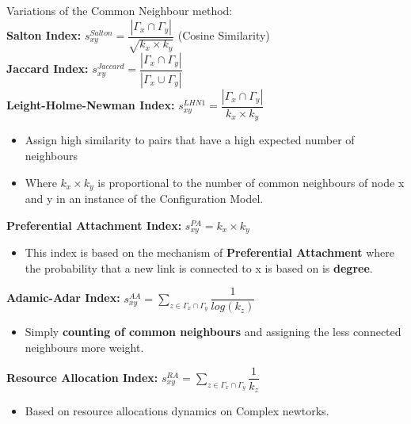 \documentclass{beamer}
\begin{document}
\begin{frame}
\bigskip
Variations of the Common Neighbour method: \\
\bigskip
\textbf{Salton Index:} $s^{Salton}_{xy} = \dfrac{|\Gamma_{x} \cap \Gamma_{y}|}{\sqrt{k_{x} \times k_{y}}}$ (Cosine Similarity)\\
\bigskip
\textbf{Jaccard Index:}  $s^{Jaccard}_{xy} = \dfrac{|\Gamma_{x} \cap \Gamma_{y}|}{|\Gamma_{x} \cup \Gamma_{y}|}$\\
\bigskip
\textbf{Leight-Holme-Newman Index:}  $s^{LHN1}_{xy} = \dfrac{|\Gamma_{x} \cap \Gamma_{y}|}{k_{x} \times k_{y}}$ \\
\begin{itemize}
    \item Assign high similarity to pairs that have a high expected number of neighbours 
    \item Where $k_{x} \times k_{y}$ is proportional to the number of common neighbours of node x and y in an instance of the Configuration Model.
\end{itemize}
\end{frame}

\begin{frame}
\textbf{Preferential Attachment Index:} $s^{PA}_{xy} = k_{x} \times k_{y}$ \\
\begin{itemize}
    \item This index is based on the mechanism of \textbf{Preferential Attachment}  where the probability that a new link is connected to x is based on is \textbf{degree}. 
\end{itemize}
\smallskip
\textbf{Adamic-Adar Index:}  $s^{AA}_{xy} = \sum_{z\in\Gamma_{x} \cap \Gamma_{y}}^{} \dfrac{1}{log(k_{z})}$\\
\begin{itemize}
    \item Simply \textbf{counting of common neighbours} and assigning the less connected neighbours more weight. 
\end{itemize}
\smallskip
\textbf{Resource Allocation Index:}  $s^{RA}_{xy} = \sum_{z\in\Gamma_{x} \cap \Gamma_{y}}^{} \dfrac{1}{k_{z}}$\\
\begin{itemize}
    \item Based on resource allocations dynamics on Complex newtorks.
\end{itemize}
\end{frame}
\end{document}
